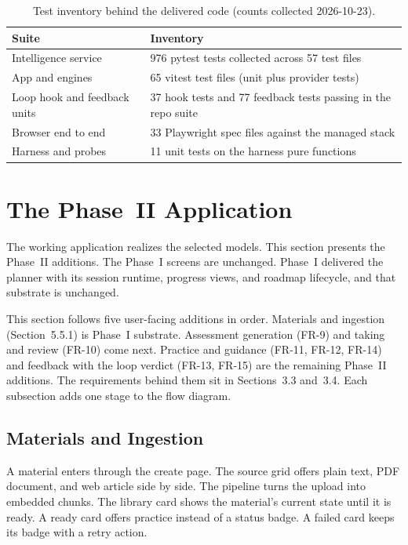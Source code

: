 \begin{table}[htbp]
\centering
\footnotesize
\caption{Test inventory behind the delivered code (counts collected 2026-10-23).}
\label{tab:phase2-testing}
\begin{tabular}{p{4.8cm} p{7.6cm}}
\toprule
\textbf{Suite} & \textbf{Inventory} \\
\midrule
Intelligence service & 976 pytest tests collected across 57 test files \\
App and engines & 65 vitest test files (unit plus provider tests) \\
Loop hook and feedback units & 37 hook tests and 77 feedback tests passing in the repo suite \\
Browser end to end & 33 Playwright spec files against the managed stack \\
Harness and probes & 11 unit tests on the harness pure functions \\
\bottomrule
\end{tabular}
\end{table}

\section{The Phase~II Application}
The working application realizes the selected models. This section presents the Phase~II additions. The Phase~I screens are unchanged. Phase~I delivered the planner with its session runtime, progress views, and roadmap lifecycle, and that substrate is unchanged.

This section follows five user-facing additions in order. Materials and ingestion (Section~5.5.1) is Phase~I substrate. Assessment generation (FR-9) and taking and review (FR-10) come next. Practice and guidance (FR-11, FR-12, FR-14) and feedback with the loop verdict (FR-13, FR-15) are the remaining Phase~II additions. The requirements behind them sit in Sections~3.3 and~3.4. Each subsection adds one stage to the flow diagram.

\subsection{Materials and Ingestion}
A material enters through the create page. The source grid offers plain text, PDF document, and web article side by side. The pipeline turns the upload into embedded chunks. The library card shows the material's current state until it is ready. A ready card offers practice instead of a status badge. A failed card keeps its badge with a retry action.

